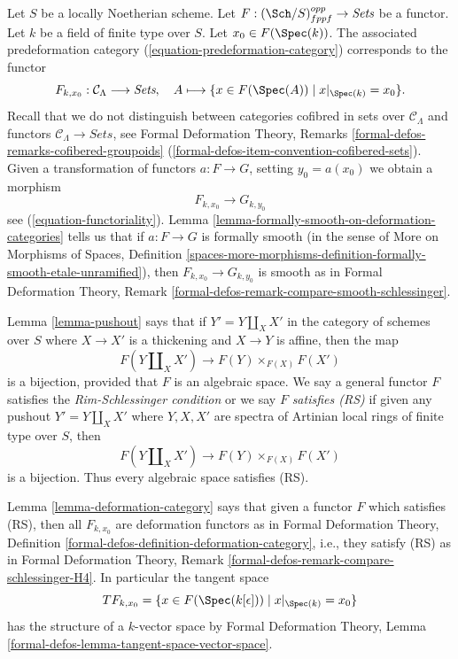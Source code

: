 \medskip\noindent
Let $S$ be a locally Noetherian scheme. Let
$F : (\Sch/S)_{fppf}^{opp} \to \textit{Sets}$ be a functor. Let $k$ be
a field of finite type over $S$. Let $x_0 \in F(\Spec(k))$.
The associated predeformation category (\ref{equation-predeformation-category})
corresponds to the functor
$$
F_{k, x_0} : \mathcal{C}_\Lambda \longrightarrow \textit{Sets},
\quad
A \longmapsto \{x \in F(\Spec(A)) \mid x|_{\Spec(k)} = x_0 \}.
$$
Recall that we do not distinguish between
categories cofibred in sets over $\mathcal{C}_\Lambda$
and functors $\mathcal{C}_\Lambda \to \textit{Sets}$,
see Formal Deformation Theory, Remarks
\ref{formal-defos-remarks-cofibered-groupoids}
(\ref{formal-defos-item-convention-cofibered-sets}).
Given a transformation of functors $a : F \to G$, setting
$y_0 = a(x_0)$ we obtain a morphism
$$
F_{k, x_0} \longrightarrow G_{k, y_0}
$$
see (\ref{equation-functoriality}).
Lemma \ref{lemma-formally-smooth-on-deformation-categories} tells us that if
$a : F \to G$ is formally smooth (in the sense of
More on Morphisms of Spaces, Definition
\ref{spaces-more-morphisms-definition-formally-smooth-etale-unramified}), then
$F_{k, x_0} \longrightarrow G_{k, y_0}$ is smooth as
in Formal Deformation Theory, Remark
\ref{formal-defos-remark-compare-smooth-schlessinger}.

\medskip\noindent
Lemma \ref{lemma-pushout} says that if $Y' = Y \amalg_X X'$ in the
category of schemes over $S$ where $X \to X'$ is a thickening and
$X \to Y$ is affine, then the map
$$
F(Y \amalg_X X') \to F(Y) \times_{F(X)} F(X')
$$
is a bijection, provided that $F$ is an algebraic space.
We say a general functor $F$ satisfies the {\it Rim-Schlessinger condition}
or we say $F$ {\it satisfies (RS)} if given any
pushout $Y' = Y \amalg_X X'$ where $Y, X, X'$ are spectra of Artinian
local rings of finite type over $S$, then
$$
F(Y \amalg_X X') \to F(Y) \times_{F(X)} F(X')
$$
is a bijection. Thus every algebraic space satisfies (RS).

\medskip\noindent
Lemma \ref{lemma-deformation-category} says that
given a functor $F$ which satisfies (RS), then all $F_{k, x_0}$
are deformation functors as in
Formal Deformation Theory, Definition
\ref{formal-defos-definition-deformation-category}, i.e., they satisfy
(RS) as in
Formal Deformation Theory, Remark
\ref{formal-defos-remark-compare-schlessinger-H4}.
In particular the tangent space
$$
TF_{k, x_0} = \{x \in F(\Spec(k[\epsilon])) \mid x|_{\Spec(k)} = x_0\}
$$
has the structure of a $k$-vector space by Formal Deformation Theory,
Lemma \ref{formal-defos-lemma-tangent-space-vector-space}.

